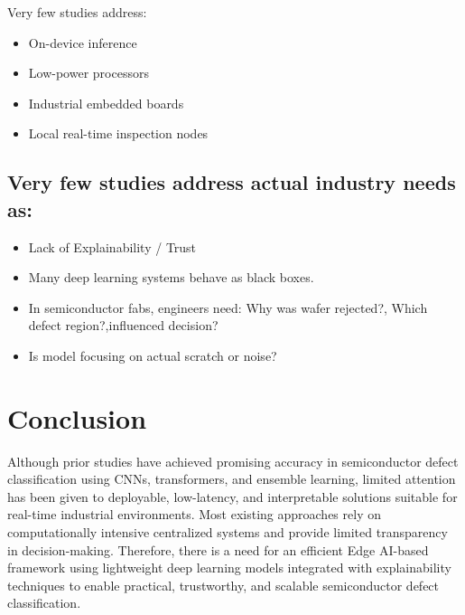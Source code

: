 Very few studies address:
 \begin{itemize}
     \item On-device inference
     \item Low-power processors
     \item Industrial embedded boards
     \item Local real-time inspection nodes
\end{itemize}

\subsection{Very few studies address actual industry needs as:}
 \begin{itemize}
     \item Lack of Explainability / Trust
     \item Many deep learning systems behave as black boxes.
     \item In semiconductor fabs, engineers need: Why was wafer rejected?, Which defect region?,influenced decision?
     \item Is model focusing on actual scratch or noise?
\end{itemize}

\section{Conclusion}
Although prior studies have achieved promising accuracy in semiconductor defect classification using CNNs, transformers, and ensemble learning, limited attention has been given to deployable, 
low-latency, and interpretable solutions suitable for real-time industrial environments. Most existing approaches rely on computationally intensive centralized systems and provide limited transparency 
in decision-making. Therefore, there is a need for an efficient Edge AI-based framework using lightweight deep learning models integrated with explainability techniques to enable practical, trustworthy, 
and scalable semiconductor defect classification.
